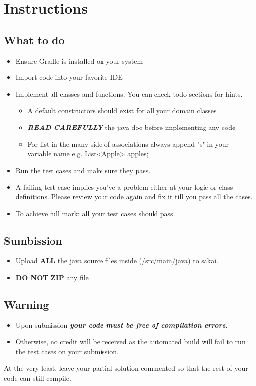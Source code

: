 \documentclass[titlepage,11pt]{article}
\begin{document}
\section{Instructions}
\subsection{What to do}
\begin{itemize}
    \item Ensure Gradle is installed on your system
	\item Import code into your favorite IDE
	\item Implement all classes and functions. You can check todo sections for hints.
        \begin{itemize}
            \item A default constructors should exist for all your domain classes
            \item \textbf{\emph{READ CAREFULLY}} the java doc before implementing any code
            \item For list in the many side of associations  always append "s" in your variable name e.g. List<Apple> apples;
        \end{itemize}
	\item Run the test cases and make sure they pass.
	\item A failing test case implies you've a problem either at your logic or class definitions.
	      Please review your code again and fix it till you pass all the cases.
	\item To achieve full mark: all your test cases should pass.
\end{itemize}

\subsection{Sumbission}
\begin{itemize}
	\item Upload \textbf{ALL} the java source files inside (/src/main/java) to sakai.
	\item \textbf{DO NOT ZIP} any file
\end{itemize}

\subsection{Warning}
\begin{itemize}
	\item Upon submission \textbf{\emph{your code must be free of compilation errors}}.
	\item Otherwise, no credit will be received as the automated build will fail to run the test cases on your submission.
\end{itemize}
At the very least, leave your partial solution commented so that the rest of your code can still compile.
\end{document}
